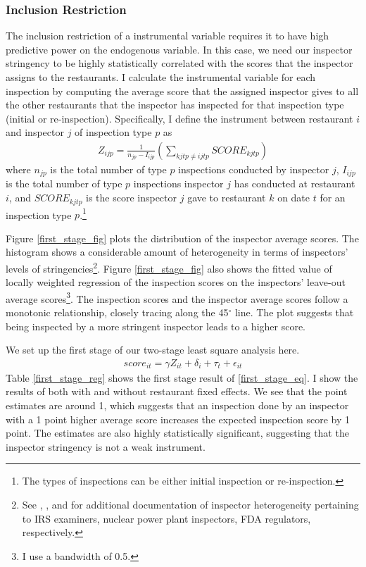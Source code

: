 \documentclass[11pt]{article}
\begin{document}
\subsubsection{Inclusion Restriction}
\label{IV_construct}
The inclusion restriction of a instrumental variable requires it to have high predictive power on the endogenous variable. In this case, we need our inspector stringency to be highly statistically correlated with the scores that the inspector assigns to the restaurants. I calculate the instrumental variable for each inspection by computing the average score that the assigned inspector gives to all the other restaurants that the inspector has inspected for that inspection type (initial or re-inspection). Specifically, I define the instrument between restaurant $i$ and inspector $j$ of inspection type $p$ as
\begin{align*}
    Z_{ijp} = \frac{1}{n_{jp} - I_{ijp}} \left( \sum_{kjtp\neq ijtp}  SCORE_{kjtp}\right)
\end{align*}
where $n_{jp}$ is the total number of type $p$ inspections conducted by inspector $j$, $I_{ijp}$ is the total number of type $p$ inspections inspector $j$ has conducted at restaurant $i$, and $SCORE_{kjtp}$ is the score inspector $j$ gave to restaurant $k$ on date $t$ for an inspection type $p$.\footnote{The types of inspections can be either initial inspection or re-inspection. } 

Figure \ref{first_stage_fig} plots the distribution of the inspector average scores. The histogram shows a considerable amount of heterogeneity in terms of inspectors' levels of stringencies\footnote{See \cite{Feinstein_89}, \cite{Feinstein_91}, and \cite{Macher_11} for additional documentation of inspector heterogeneity pertaining to IRS examiners, nuclear power plant inspectors, FDA regulators, respectively.}. Figure \ref{first_stage_fig} also shows the fitted value of locally weighted regression of the inspection scores on the inspectors' leave-out average scores\footnote{I use a bandwidth of 0.5.}. The inspection scores and the inspector average scores follow a monotonic relationship, closely tracing along the 45$^\circ$ line. The plot suggests that being inspected by a more stringent inspector leads to a higher score. 

We set up the first stage of our two-stage least square analysis here. 
\begin{align}
score_{it} = \gamma Z_{it} + \delta_i + \tau_t + \epsilon_{it}
\label{first_stage_eq}
\end{align}
Table \ref{first_stage_reg} shows the first stage result of \eqref{first_stage_eq}. I show the results of both with and without restaurant fixed effects. We see that the point estimates are around 1, which suggests that an inspection done by an inspector with a 1 point higher average score increases the expected inspection score by 1 point. The estimates are also highly statistically significant, suggesting that the inspector stringency is not a weak instrument. 
\end{document}
